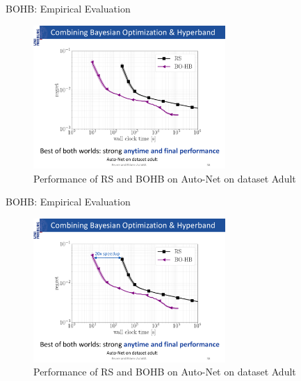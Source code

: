 \begin{frame}{BOHB: Empirical Evaluation}
\begin{figure}
    \centering
    \includegraphics[width=0.65\textwidth]{../w07_hpo_speedup/images/bohb/BOHB_1.pdf}
    \caption{Performance of RS and BOHB on Auto-Net on dataset Adult}
\end{figure}

\end{frame}
\begin{frame}{BOHB: Empirical Evaluation}
\begin{figure}
    \centering
    \includegraphics[width=0.65\textwidth]{../w07_hpo_speedup/images/bohb/BOHB_2.pdf}
    \caption{Performance of RS and BOHB on Auto-Net on dataset Adult}
\end{figure}

\end{frame}
